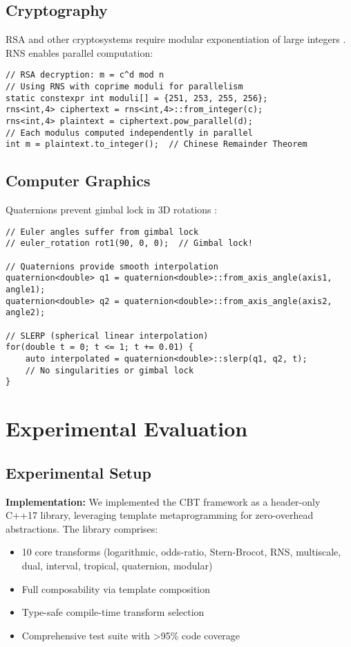 \documentclass[11pt]{article}
\theoremstyle{definition}
\begin{document}
\subsection{Cryptography}

RSA and other cryptosystems require modular exponentiation of large integers \cite{rivest1978method}. RNS enables parallel computation:

\begin{lstlisting}[caption={Parallel RSA decryption using RNS}]
// RSA decryption: m = c^d mod n
// Using RNS with coprime moduli for parallelism
static constexpr int moduli[] = {251, 253, 255, 256};
rns<int,4> ciphertext = rns<int,4>::from_integer(c);
rns<int,4> plaintext = ciphertext.pow_parallel(d);  
// Each modulus computed independently in parallel
int m = plaintext.to_integer();  // Chinese Remainder Theorem
\end{lstlisting}

\subsection{Computer Graphics}

Quaternions prevent gimbal lock in 3D rotations \cite{shoemake1985animating}:

\begin{lstlisting}[caption={Smooth rotation interpolation using quaternions}]
// Euler angles suffer from gimbal lock
// euler_rotation rot1(90, 0, 0);  // Gimbal lock!

// Quaternions provide smooth interpolation  
quaternion<double> q1 = quaternion<double>::from_axis_angle(axis1, angle1);
quaternion<double> q2 = quaternion<double>::from_axis_angle(axis2, angle2);

// SLERP (spherical linear interpolation)
for(double t = 0; t <= 1; t += 0.01) {
    auto interpolated = quaternion<double>::slerp(q1, q2, t);
    // No singularities or gimbal lock
}
\end{lstlisting}

\section{Experimental Evaluation}
\label{sec:evaluation}

\subsection{Experimental Setup}

\textbf{Implementation:} We implemented the CBT framework as a header-only C++17 library, leveraging template metaprogramming for zero-overhead abstractions. The library comprises:
\begin{itemize}
\item 10 core transforms (logarithmic, odds-ratio, Stern-Brocot, RNS, multiscale, dual, interval, tropical, quaternion, modular)
\item Full composability via template composition
\item Type-safe compile-time transform selection
\item Comprehensive test suite with >95\% code coverage
\end{itemize}
\end{document}
